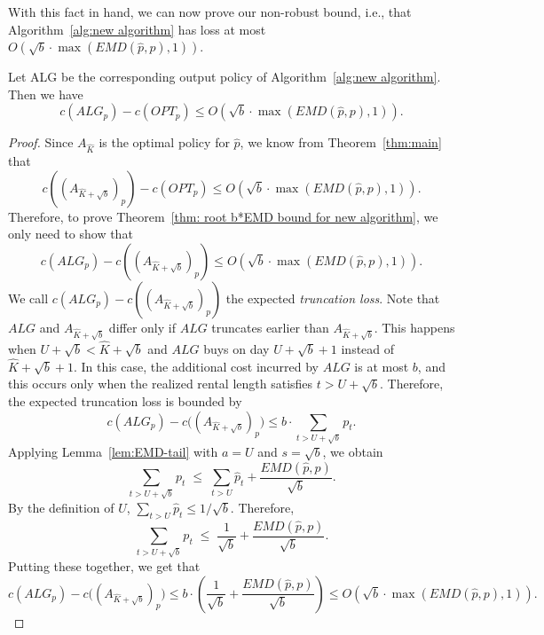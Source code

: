 With this fact in hand, we can now prove our non-robust bound, i.e., that Algorithm~\ref{alg:new algorithm} has loss at most $O\!\left(\sqrt{b}\cdot \max\!\left(EMD(\hat p,p),1\right)\right)$. 

\begin{thm}
    \label{thm: root b*EMD bound for new algorithm}
    Let ALG be the corresponding output policy of Algorithm~\ref{alg:new algorithm}. Then we have
    \[c(ALG_p) - c(OPT_p) \leq O\left(\sqrt{b} \cdot \max\left(EMD(\hat p, p), 1\right)\right).\]
\end{thm}

\begin{proof}
    Since $A_{\hat{K}}$ is the optimal policy for $\hat{p}$, we know from Theorem~\ref{thm:main} that 
    \[c((A_{\hat{K}+\sqrt b})_p) - c(OPT_p) \leq O\left(\sqrt{b} \cdot \max\left(EMD(\hat p, p), 1\right)\right).\]
    Therefore, to prove Theorem~\ref{thm: root b*EMD bound for new algorithm}, we only need to show that 
    \[c(ALG_p) - c((A_{\hat{K}+\sqrt b})_p)  \leq O\left(\sqrt{b} \cdot \max\left(EMD(\hat p, p), 1\right)\right).\]
    We call $c(ALG_p) - c((A_{\hat{K}+\sqrt b})_p)$ the expected \emph{truncation loss}. Note that $ALG$ and $A_{\hat{K}+\sqrt b}$ differ only if $ALG$ truncates earlier than $A_{\hat{K}+\sqrt b}$. This happens when $U+\sqrt{b} < \hat K + \sqrt{b}$ and $ALG$ buys on day $U+\sqrt b+1$ instead of $\hat K+\sqrt b+1$.
    In this case, the additional cost incurred by $ALG$ is at most $b$, and this occurs only when the realized rental length satisfies $t>U+\sqrt b$.
    Therefore, the expected truncation loss is bounded by
    \[c(ALG_p)-c\big((A_{\hat K+\sqrt b})_p\big) \leq b\cdot \sum_{t>U+\sqrt b} p_t .\]
    Applying Lemma~\ref{lem:EMD-tail} with $a=U$ and $s=\sqrt b$, we obtain
    \[\sum_{t>U+\sqrt b} p_t \;\le\; \sum_{t>U} \hat p_t + \frac{EMD(\hat p,p)}{\sqrt b}.\]
    By the definition of $U$, $\sum_{t>U} \hat p_t \le 1/\sqrt b$.
    Therefore,
    \[\sum_{t>U+\sqrt b} p_t \;\le\; \frac{1}{\sqrt b} + \frac{EMD(\hat p,p)}{\sqrt b}.\]
    Putting these together, we get that
    \[c(ALG_p)-c\big((A_{\hat K+\sqrt b})_p\big) \leq b \cdot \left( \frac{1}{\sqrt b} + \frac{EMD(\hat p,p)}{\sqrt b} \right) \leq O\left(\sqrt{b} \cdot \max\left(EMD(\hat p, p), 1\right)\right).\]
\end{proof}

